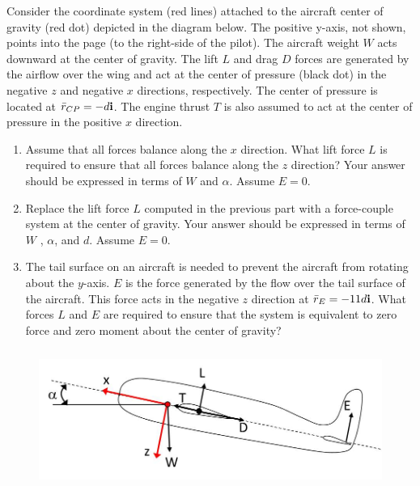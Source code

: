 

Consider the coordinate system (red lines) attached to the aircraft center of gravity (red dot) depicted in the
diagram below. The positive y-axis, not shown, points into the page (to the right-side of the pilot). The aircraft
weight $W$ acts downward at the center of gravity. The lift $L$ and drag $D$ forces are generated by the airflow
over the wing and act at the center of pressure (black dot) in the negative $z$ and negative $x$ directions,
respectively. The center of pressure is located at $\bar{r}_{CP} = -d {\bf i}$. The engine thrust $T$ is also assumed to act at
the center of pressure in the positive $x$ direction. 

\begin{enumerate}
  \item Assume that all forces balance along the $x$ direction. What lift force $L$ is required to ensure that all forces
  balance along the $z$ direction? Your answer should be expressed in terms of $W$ and $\alpha$. Assume $E = 0$. 
  \item Replace the lift force $L$ computed in the previous part with a force-couple system at the center of gravity.
Your answer should be expressed in terms of $W$ , $\alpha$, and $d$.  Assume $E = 0$.
  \item The tail surface on an aircraft is needed to prevent the aircraft from rotating about the $y$-axis. $E$ is the
  force generated by the flow over the tail surface of the aircraft. This force acts in the negative $z$ direction at $\bar{r}_{E} = -11d{\bf i}$.  What forces $L$ and $E$ are required to ensure that the system is equivalent to zero force and zero moment about the center of gravity?
\end{enumerate}

\begin{figure}[ht!]
  \centering
  \includegraphics[height=1.8in]{fig.png}
\end{figure}

